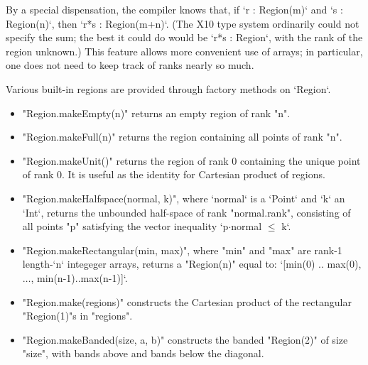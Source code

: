 By a special dispensation, the compiler knows that, if \xcd`r : Region(m)` and
\xcd`s : Region(n)`, then \xcd`r*s : Region(m+n)`.  (The X10 type system
ordinarily could not specify the sum; the best it could do 
would be \xcd`r*s : Region`, with the rank of the region unknown.)  This
feature allows more convenient use of arrays; in particular, one does not need
to keep track of ranks nearly so much.





Various built-in regions are provided through  factory
methods on \xcd`Region`.  
\begin{itemize}
\item \xcd"Region.makeEmpty(n)" returns an empty region of rank \xcd"n".
\item \xcd"Region.makeFull(n)" returns the region containing all points of
      rank \xcd"n".  
\item \xcd"Region.makeUnit()" returns the region of rank 0 containing the
      unique point of rank 0.  It is useful as the identity for Cartesian
      product of regions.
\item \xcd"Region.makeHalfspace(normal, k)",
      where \xcd`normal` is a \xcd`Point` and \xcd`k` an \xcd`Int`, 
      returns the unbounded
      half-space of rank \xcd"normal.rank", consisting of all points \xcd"p"
      satisfying the vector inequality \xcdmath`p$\cdot$normal $\le$ k`.
\item \xcd"Region.makeRectangular(min, max)", 
      where \xcd"min" and \xcd"max"
      are rank-1 length-\xcd`n` integeger arrays, returns a
      \xcd"Region(n)" equal to: 
      \xcdmath`[min(0) .. max(0), $\ldots$, min(n-1)..max(n-1)]`.
\item \xcd"Region.make(regions)" constructs the Cartesian product of the
      rectangular \xcd"Region(1)"s in \xcd"regions".
\item \xcd"Region.makeBanded(size, a, b)" constructs the
      banded \xcd"Region(2)" of size \xcd"size", with  bands above
      and  bands below the diagonal.

\end{itemize}
